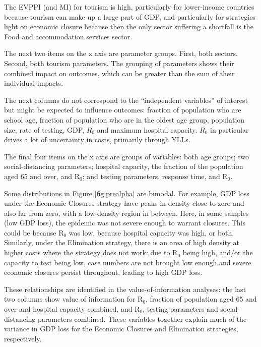 \documentclass[
]{article}
\begin{document}
The EVPPI (and MI) for tourism is high, particularly for lower-income countries because tourism can make up a large part of GDP, and particularly for strategies light on economic closure because then the only sector suffering a shortfall is the Food and accommodation services sector.

The next two items on the x axis are parameter groups. First, both sectors. Second, both tourism parameters. The grouping of parameters shows their combined impact on outcomes, which can be greater than the sum of their individual impacts.

The next columns do not correspond to the ``independent variables'' of interest but might be expected to influence outcomes: fraction of population who are school age, fraction of population who are in the oldest age group, population size, rate of testing, GDP, \(R_0\) and maximum hospital capacity. \(R_0\) in particular drives a lot of uncertainty in costs, primarily through YLLs.

The final four items on the x axis are groups of variables: both age groups; two social-distancing parameters; hospital capacity, the fraction of the population aged 65 and over, and R\(_0\); and testing parameters, response time, and R\(_0\).

Some distributions in Figure \ref{fig:prealpha} are bimodal. For example, GDP loss under the Economic Closures strategy have peaks in density close to zero and also far from zero, with a low-density region in between. Here, in some samples (low GDP loss), the epidemic was not severe enough to warrant closures. This could be because R\(_0\) was low, because hospital capacity was high, or both. Similarly, under the Elimination strategy, there is an area of high density at higher costs where the strategy does not work: due to R\(_0\) being high, and/or the capacity to test being low, case numbers are not brought low enough and severe economic closures persist throughout, leading to high GDP loss.

These relationships are identified in the value-of-information analyses: the last two columns show value of information for R\(_0\), fraction of population aged 65 and over and hospital capacity combined, and R\(_0\), testing parameters and social-distancing parameters combined. These variables together explain much of the variance in GDP loss for the Economic Closures and Elimination strategies, respectively.
\end{document}

